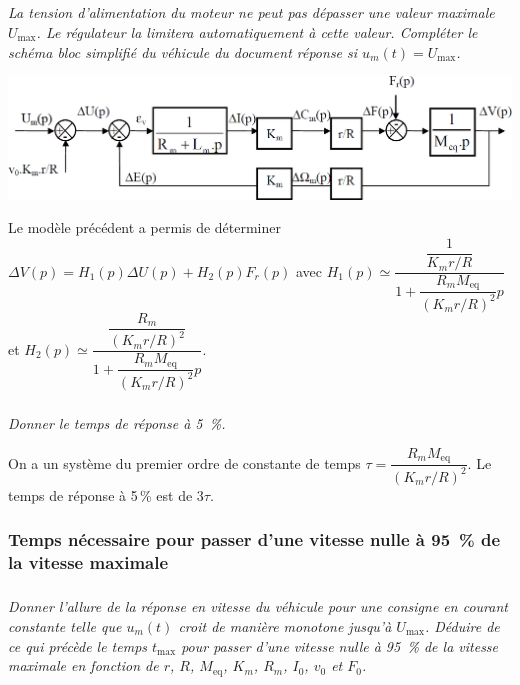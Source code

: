 \documentclass[10pt,fleqn]{article} %
\begin{document}
\subparagraph{}
\textit{La tension d’alimentation du moteur ne peut pas dépasser une valeur maximale $U_{\text{max}}$. Le
régulateur la limitera automatiquement à cette valeur. Compléter le schéma bloc simplifié du véhicule du
 document réponse si $u_m(t)=U_{\text{max}}$.}
\ifprof
\begin{corrige}
\begin{center}
\includegraphics[width=.95\linewidth]{images/cor_01}
\end{center}

\end{corrige}
\else
\fi

Le modèle précédent a permis de déterminer $\Delta V (p)=H_1(p)\Delta U(p)+H_2(p)F_r(p)$ avec $H_1(p)\simeq \dfrac{\dfrac{1}{K_m r / R}}{1+\dfrac{R_m M_{\text{eq}}}{\left(K_m r /R\right)^2}p}$ et $H_2(p)\simeq \dfrac{\dfrac{R_m}{\left(K_m r /R\right)^2}}{1+\dfrac{R_m M_{\text{eq}}}{\left(K_m r /R\right)^2}p}$.

\subparagraph{}
\textit{Donner le temps de réponse à 5\, \%.}

\ifprof
\begin{corrige}
On a un système du premier ordre de constante de temps $\tau = \dfrac{R_m M_{\text{eq}}}{\left(K_m r /R\right)^2}$. Le temps de réponse à 5\,\% est de $3\tau$. 
\end{corrige}
\else
\fi


\subsubsection*{Temps nécessaire pour passer d’une vitesse nulle à 95\, \% de la vitesse maximale}

\subparagraph{}
\textit{Donner l’allure de la réponse en vitesse du véhicule pour une consigne en courant constante telle que $u_m(t)$ croit de manière monotone jusqu’à $U_{\text{max}}$. Déduire de ce qui précède le temps $t_{\text{max}}$ pour passer
d’une vitesse nulle à 95\, \% de la vitesse maximale en fonction de $r$, $R$, $M_{\text{eq}}$, 
$K_m$, $R_m$, $I_0$, $v_0$ et $F_0$.}
\ifprof
\begin{corrige}
\end{corrige}
\else
\fi
\end{document}
